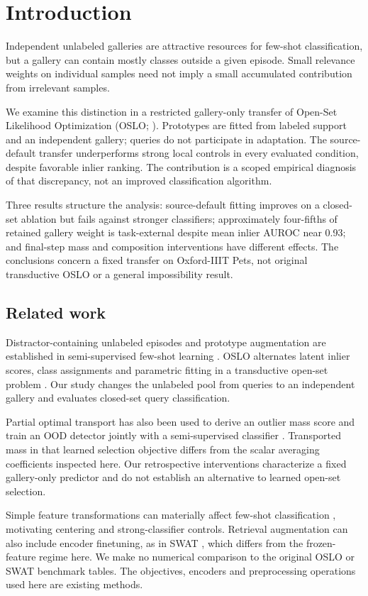\section{Introduction}
Independent unlabeled galleries are attractive resources for few-shot classification, but a gallery can contain mostly classes outside a given episode. Small relevance weights on individual samples need not imply a small accumulated contribution from irrelevant samples.

We examine this distinction in a restricted gallery-only transfer of Open-Set Likelihood Optimization (OSLO; \citealp{oslo}). Prototypes are fitted from labeled support and an independent gallery; queries do not participate in adaptation. The source-default transfer underperforms strong local controls in every evaluated condition, despite favorable inlier ranking. The contribution is a scoped empirical diagnosis of that discrepancy, not an improved classification algorithm.

Three results structure the analysis: source-default fitting improves on a closed-set ablation but fails against stronger classifiers; approximately four-fifths of retained gallery weight is task-external despite mean inlier AUROC near 0.93; and final-step mass and composition interventions have different effects. The conclusions concern a fixed transfer on Oxford-IIIT Pets, not original transductive OSLO or a general impossibility result.

\subsection{Related work}
Distractor-containing unlabeled episodes and prototype augmentation are established in semi-supervised few-shot learning \citep{ren2018}. OSLO alternates latent inlier scores, class assignments and parametric fitting in a transductive open-set problem \citep{oslo}. Our study changes the unlabeled pool from queries to an independent gallery and evaluates closed-set query classification.

Partial optimal transport has also been used to derive an outlier mass score and train an OOD detector jointly with a semi-supervised classifier \citep{ijcai2024p536}. Transported mass in that learned selection objective differs from the scalar averaging coefficients inspected here. Our retrospective interventions characterize a fixed gallery-only predictor and do not establish an alternative to learned open-set selection.

Simple feature transformations can materially affect few-shot classification \citep{simpleshot}, motivating centering and strong-classifier controls. Retrieval augmentation can also include encoder finetuning, as in SWAT \citep{swat}, which differs from the frozen-feature regime here. We make no numerical comparison to the original OSLO or SWAT benchmark tables. The objectives, encoders and preprocessing operations used here are existing methods.
